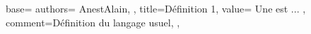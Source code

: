 {
  base={
    authors={
      AnestAlain,
    },
    title=Définition 1,
    value={
      Une  est ...
    },
    comment={Définition du langage usuel},
  },
}

